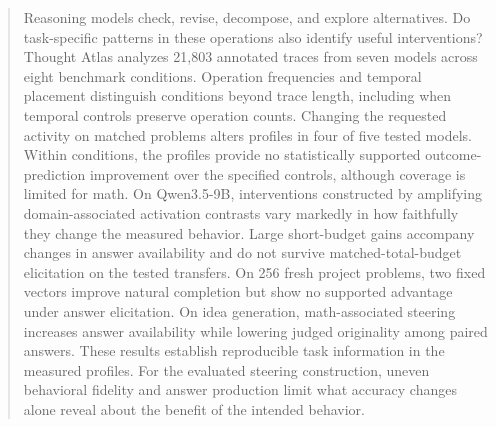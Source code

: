 \begin{abstract}
Reasoning models check, revise, decompose, and explore alternatives. Do task-specific patterns in these operations also identify useful interventions? Thought Atlas analyzes 21,803 annotated traces from seven models across eight benchmark conditions. Operation frequencies and temporal placement distinguish conditions beyond trace length, including when temporal controls preserve operation counts. Changing the requested activity on matched problems alters profiles in four of five tested models. Within conditions, the profiles provide no statistically supported outcome-prediction improvement over the specified controls, although coverage is limited for math. On Qwen3.5-9B, interventions constructed by amplifying domain-associated activation contrasts vary markedly in how faithfully they change the measured behavior. Large short-budget gains accompany changes in answer availability and do not survive matched-total-budget elicitation on the tested transfers. On 256 fresh project problems, two fixed vectors improve natural completion but show no supported advantage under answer elicitation. On idea generation, math-associated steering increases answer availability while lowering judged originality among paired answers. These results establish reproducible task information in the measured profiles. For the evaluated steering construction, uneven behavioral fidelity and answer production limit what accuracy changes alone reveal about the benefit of the intended behavior.
\end{abstract}
